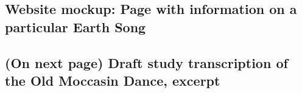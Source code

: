 \documentclass{neh}
\begin{document}
\subsection{Website  mockup: Page with information on a particular Earth Song}

\subsection{(On next page) Draft study transcription of the Old Moccasin
Dance, excerpt} 


\end{document}
